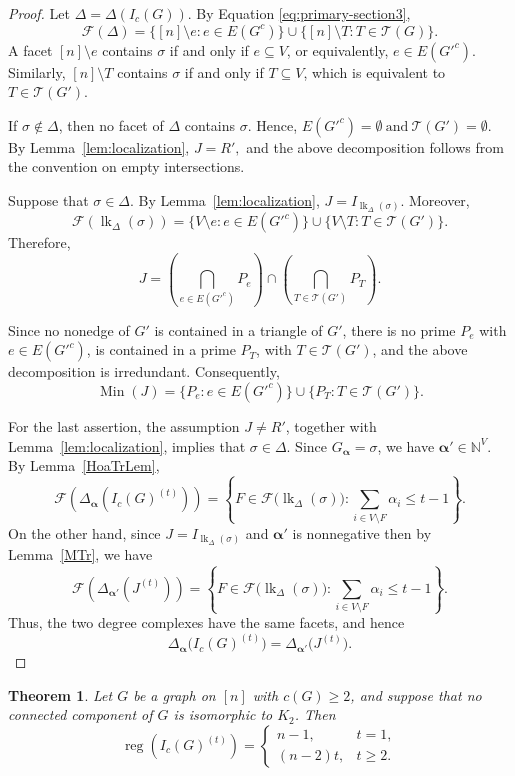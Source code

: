 \documentclass[12pt]{amsart}
\newtheorem{theorem}[proposition]{Theorem}
\DeclareMathOperator{\Min}{Min}
\DeclareMathOperator{\lk}{lk}
\begin{document}
\begin{proof}
Let $\Delta=\Delta(I_c(G)).$ By Equation \eqref{eq:primary-section3},
\[
\mathcal F(\Delta)
=
\{[n]\setminus e:e\in E(G^c)\}
\cup
\{[n]\setminus T:T\in\mathcal T(G)\}.
\]
A facet \([n]\setminus e\) contains \(\sigma\) if and only if
\(e\subseteq V\), or equivalently, $e\in E(G'^c).$ Similarly, $[n]\setminus T $ contains $\sigma$ if and only if $T \subseteq V$, which is equivalent to $ T\in\mathcal T(G').$

If \(\sigma\notin\Delta\), then no facet of \(\Delta\) contains
\(\sigma\). Hence, $E(G'^c)=\emptyset \ \text{and} \ \mathcal T(G')=\emptyset. $ By Lemma~\ref{lem:localization}, $J=R', $ and the above decomposition follows from the convention on empty
intersections.

Suppose that \(\sigma\in\Delta\). By
Lemma~\ref{lem:localization}, $ J=I_{\lk_\Delta(\sigma)}.$ Moreover,
\[
\mathcal F(\lk_\Delta(\sigma))
=
\{V\setminus e:e\in E(G'^c)\}
\cup
\{V\setminus T:T\in\mathcal T(G')\}.
\]
Therefore,
\[
J
=
\left(\bigcap_{e\in E(G'^c)}P_e\right)
\cap
\left(\bigcap_{T\in\mathcal T(G')}P_T\right).
\]
\noindent

Since no nonedge of \(G'\) is contained in a triangle of \(G'\),  there is no
prime \(P_e\) with \(e\in E(G'^c)\), is contained in a prime \(P_T\), with
\(T\in\mathcal T(G')\), and the above decomposition is
irredundant. Consequently,
\[
\Min(J)
=
\{P_e:e\in E(G'^c)\}
\cup
\{P_T:T\in\mathcal T(G')\}.
\]

For the last assertion, the assumption \(J\neq R'\), together with Lemma~\ref{lem:localization}, implies that \(\sigma\in\Delta\). Since \(G_{\boldsymbol\alpha}=\sigma\), we have \(\boldsymbol\alpha'\in\mathbb N^V\). By Lemma~\ref{HoaTrLem},
\[
\mathcal F\left(
\Delta_{\boldsymbol\alpha}(I_c(G)^{(t)})
\right)
=
\left\{
F\in
\mathcal F\bigl(\lk_\Delta(\sigma)\bigr):
\sum_{i\in V\setminus F}\alpha_i\le t-1
\right\}.
\]
On the other hand, since $J=I_{\lk_\Delta(\sigma)} $ and \(\boldsymbol\alpha'\) is nonnegative then by Lemma~\ref{MTr}, we have
\[
\mathcal F\left(
\Delta_{\boldsymbol\alpha'}(J^{(t)})
\right)
=
\left\{
F\in
\mathcal F\bigl(\lk_\Delta(\sigma)\bigr):
\sum_{i\in V\setminus F}\alpha_i\le t-1
\right\}.
\]
Thus, the two degree complexes have the same facets, and hence
\[
\Delta_{\boldsymbol\alpha}
\bigl(I_c(G)^{(t)}\bigr)
=
\Delta_{\boldsymbol\alpha'}
\bigl(J^{(t)}\bigr).
\]
\end{proof}


\begin{theorem}\label{thm:no-k2-component}
Let $G$ be a graph on $[n]$ with $c(G)\ge2$, and suppose that no connected component of $G$ is isomorphic to $K_2$. Then
\[
\operatorname{reg}(I_c(G)^{(t)})=
\begin{cases}
n-1, & t=1,\\
(n-2)t, & t\ge2.
\end{cases}
\]
\end{theorem}
\end{document}
